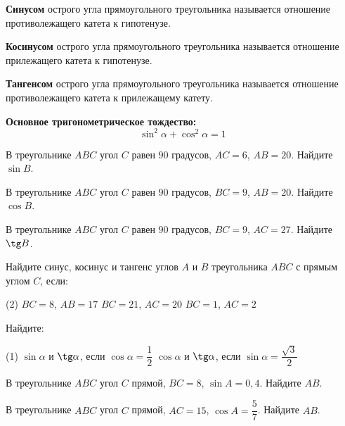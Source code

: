 %
%

\begin{class}[number=1]
	\begin{definit}
		\textbf{Синусом} острого угла прямоугольного треугольника называется отношение противолежащего катета к гипотенузе.
	\end{definit}
	\begin{definit}
		\textbf{Косинусом} острого угла прямоугольного треугольника называется отношение прилежащего катета к гипотенузе.
	\end{definit}
	\begin{definit}
		\textbf{Тангенсом} острого угла прямоугольного треугольника называется отношение противолежащего катета к прилежащему катету.
	\end{definit}
	\begin{definit}
		\textbf{Основное тригонометрическое тождество:} \[\sin^2\alpha+\cos^2\alpha=1\]
	\end{definit}
	\begin{listofex}
		\item В треугольнике \( ABC \) угол \( C \) равен \( 90 \) градусов, \( AC=6 \), \( AB=20 \). Найдите \( \sin B \).
		\item  В треугольнике \( ABC \) угол \( C \) равен \( 90 \) градусов, \( BC=9 \), \( AB=20 \). Найдите \( \cos B \).
		\item В треугольнике \( ABC \) угол \( C \) равен \( 90 \) градусов, \( BC=9 \), \( AC=27 \). Найдите \( \tg B \).
		\item Найдите синус, косинус и тангенс углов \( A \) и \( B \) треугольника \( ABC \) с прямым углом \( C \), если:
		\begin{tasks}(2)
			\task \( BC=8 \), \( AB=17 \)
			\task \( BC=21 \), \( AC=20 \)
			\task \( BC=1 \), \( AC=2 \)
		\end{tasks}
		\item Найдите:
		\begin{tasks}(1)
			\task \( \sin\alpha \) и \( \tg\alpha \), если \( \cos\alpha=\dfrac{1}{2} \)
			\task \( \cos\alpha \) и \( \tg\alpha \), если \( \sin\alpha=\dfrac{\sqrt{3}}{2} \)
		\end{tasks}
		\item В треугольнике \( ABC \) угол \( C \) прямой, \( BC=8 \), \( \sin A=0,4 \). Найдите \( AB \).
		\item В треугольнике \( ABC \) угол \( C \) прямой, \( AC=15 \), \( \cos A=\dfrac{5}{7} \). Найдите \( AB \).

\end{listofex}
\end{class}
